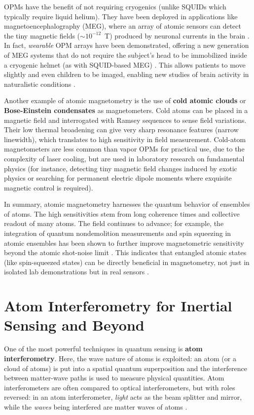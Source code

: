 OPMs have the benefit of not requiring cryogenics (unlike SQUIDs which
typically require liquid helium). They have been deployed in
applications like magnetoencephalography (MEG), where an array of
atomic sensors can detect the tiny magnetic fields
($\sim$$10^{-12}$~T) produced by neuronal currents in the brain . In
fact, \emph{wearable} OPM arrays have been demonstrated, offering a
new generation of MEG systems that do not require the subject’s head
to be immobilized inside a cryogenic helmet (as with SQUID-based MEG)
. This allows patients to move slightly and even children to be
imaged, enabling new studies of brain activity in naturalistic
conditions .



Another example of atomic magnetometry is the use of \textbf{cold
  atomic clouds} or \textbf{Bose-Einstein condensates} as
magnetometers. Cold atoms can be placed in a magnetic field and
interrogated with Ramsey sequences to sense field variations. Their
low thermal broadening can give very sharp resonance features (narrow
linewidth), which translates to high sensitivity in field
measurement. Cold-atom magnetometers are less common than vapor OPMs
for practical use, due to the complexity of laser cooling, but are
used in laboratory research on fundamental physics (for instance,
detecting tiny magnetic field changes induced by exotic physics or
searching for permanent electric dipole moments where exquisite
magnetic control is required).



In summary, atomic magnetometry harnesses the quantum behavior of
ensembles of atoms. The high sensitivities stem from long coherence
times and collective readout of many atoms. The field continues to
advance; for example, the integration of quantum nondemolition
measurements and spin squeezing in atomic ensembles has been shown to
further improve magnetometric sensitivity beyond the atomic shot-noise
limit . This indicates that entangled atomic states (like
spin-squeezed states) can be directly beneficial in magnetometry, not
just in isolated lab demonstrations but in real sensors .



\section{Atom Interferometry for Inertial Sensing and Beyond}\label{sec:atom-interf}

One of the most powerful techniques in quantum sensing is \textbf{atom
  interferometry}. Here, the wave nature of atoms is exploited: an
atom (or a cloud of atoms) is put into a spatial quantum superposition
and the interference between matter-wave paths is used to measure
physical quantities. Atom interferometers are often compared to
optical interferometers, but with roles reversed: in an atom
interferometer, \emph{light} acts as the beam splitter and mirror,
while the \emph{waves} being interfered are matter waves of atoms .




